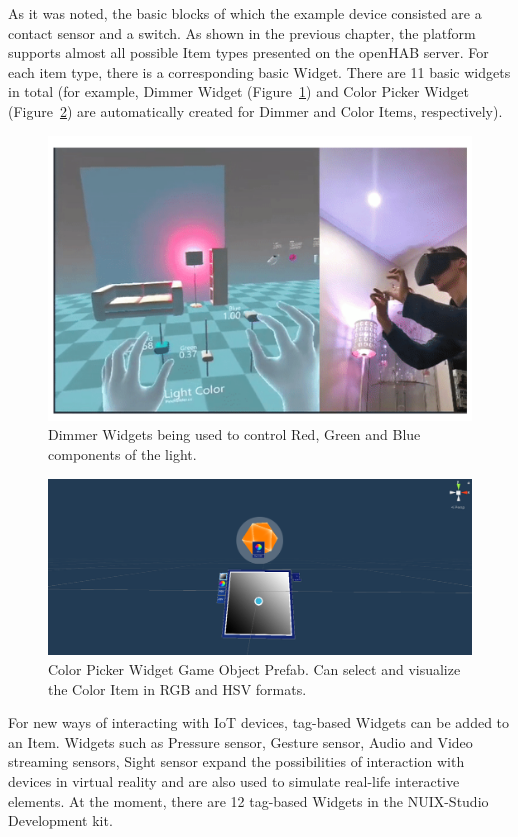 As it was noted, the basic blocks of which the example device consisted are a contact sensor and a switch. As shown in the previous chapter, the platform supports almost all possible Item types presented on the openHAB server. For each item type, there is a corresponding basic Widget. There are 11 basic widgets in total (for example, Dimmer Widget (Figure~\ref{fig:DimmerWidgets-figure}) and Color Picker Widget (Figure~\ref{fig:ColorPickerWidget-figure}) are automatically created for Dimmer and Color Items, respectively). 

\begin{figure}
  \centering
  \includegraphics[width=0.9\linewidth]{figures/DimmerWidgets.png}
  \caption{Dimmer Widgets being used to control Red, Green and Blue components of the light.}
  \label{fig:DimmerWidgets-figure}
\end{figure}

\begin{figure}
  \centering
  \includegraphics[width=0.9\linewidth]{figures/ColorPickerWidget.png}
  \caption{Color Picker Widget Game Object Prefab. Can select and visualize the Color Item in RGB and HSV formats.}
  \label{fig:ColorPickerWidget-figure}
\end{figure}

For new ways of interacting with IoT devices, tag-based Widgets can be added to an Item. Widgets such as Pressure sensor, Gesture sensor, Audio and Video streaming sensors, Sight sensor expand the possibilities of interaction with devices in virtual reality and are also used to simulate real-life interactive elements. At the moment, there are 12 tag-based Widgets in the NUIX-Studio Development kit. 


